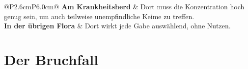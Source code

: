\begin{merksatz}
\begin{center}
\renewcommand{\arraystretch}{1.5}
\begin{tabular}{@{}P{2.6cm}P{6.0cm}@{}}
\toprule
\textbf{Am Krankheitsherd} & Dort muss die Konzentration hoch genug sein, um auch teilweise unempfindliche Keime zu treffen.\\
\textbf{In der übrigen Flora} & Dort wirkt jede Gabe auswählend, ohne Nutzen.\\
\bottomrule
\end{tabular}
\end{center}

\begin{center}
\begin{minipage}{0.88\textwidth}
\end{minipage}
\end{center}
\end{merksatz}

\section{Der Bruchfall}

